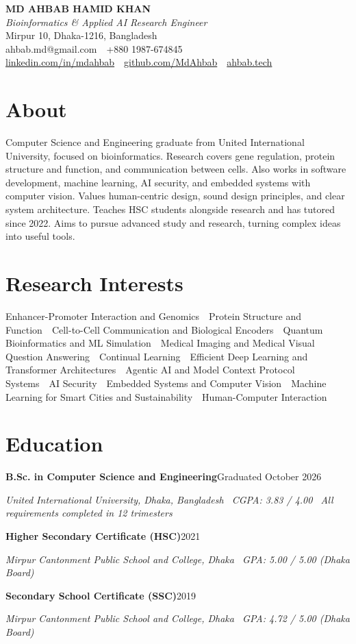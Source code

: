 \documentclass[10pt,a4paper]{article}
\newcommand{\entry}[2]{\needspace{3\baselineskip}\textbf{#1}\hfill #2\par}
\newcommand{\sub}[1]{\textit{#1}\par}
\newcommand{\sep}{\ \textbullet\ }
\begin{document}
\begin{center}
  {\LARGE\bfseries MD AHBAB HAMID KHAN}\\[3pt]
  {\color{cvblue}\itshape Bioinformatics \& Applied AI Research Engineer}\\[2pt]
  Mirpur 10, Dhaka-1216, Bangladesh\\[1pt]
  ahbab.md@gmail.com\sep +880 1987-674845\\[1pt]
  \href{https://linkedin.com/in/mdahbab}{linkedin.com/in/mdahbab}\sep \href{https://github.com/MdAhbab}{github.com/MdAhbab}\sep \href{https://ahbab.tech}{ahbab.tech}
\end{center}
\vspace{-6pt}

\section{About}
Computer Science and Engineering graduate from United International University, focused on bioinformatics. Research covers gene regulation, protein structure and function, and communication between cells. Also works in software development, machine learning, AI security, and embedded systems with computer vision. Values human-centric design, sound design principles, and clear system architecture. Teaches HSC students alongside research and has tutored since 2022. Aims to pursue advanced study and research, turning complex ideas into useful tools.

\section{Research Interests}
Enhancer-Promoter Interaction and Genomics\sep Protein Structure and Function\sep Cell-to-Cell Communication and Biological Encoders\sep Quantum Bioinformatics and ML Simulation\sep Medical Imaging and Medical Visual Question Answering\sep Continual Learning\sep Efficient Deep Learning and Transformer Architectures\sep Agentic AI and Model Context Protocol Systems\sep AI Security\sep Embedded Systems and Computer Vision\sep Machine Learning for Smart Cities and Sustainability\sep Human-Computer Interaction

\section{Education}
\entry{B.Sc. in Computer Science and Engineering}{Graduated October 2026}
\sub{United International University, Dhaka, Bangladesh \textbullet\ CGPA: 3.83 / 4.00 \textbullet\ All requirements completed in 12 trimesters}
\vspace{2pt}
\entry{Higher Secondary Certificate (HSC)}{2021}
\sub{Mirpur Cantonment Public School and College, Dhaka \textbullet\ GPA: 5.00 / 5.00 (Dhaka Board)}
\vspace{2pt}
\entry{Secondary School Certificate (SSC)}{2019}
\sub{Mirpur Cantonment Public School and College, Dhaka \textbullet\ GPA: 4.72 / 5.00 (Dhaka Board)}
\end{document}
